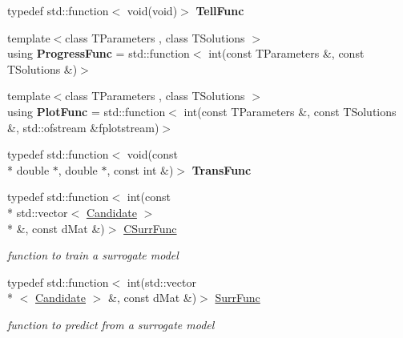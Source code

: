 \begin{DoxyCompactItemize}
\item 
\hypertarget{namespacelibcmaes_acee23101cbc8d94c127b10f3c04a595e}{typedef std\+::function$<$ void(void)$>$ {\bfseries Tell\+Func}}\label{namespacelibcmaes_acee23101cbc8d94c127b10f3c04a595e}

\item 
\hypertarget{namespacelibcmaes_a8d4db4c2a1758fd5964499aba7cf8a9f}{{\footnotesize template$<$class T\+Parameters , class T\+Solutions $>$ }\\using {\bfseries Progress\+Func} = std\+::function$<$ int(const T\+Parameters \&, const T\+Solutions \&)$>$}\label{namespacelibcmaes_a8d4db4c2a1758fd5964499aba7cf8a9f}

\item 
\hypertarget{namespacelibcmaes_aaf23de7982c40bf628eba76801677b78}{{\footnotesize template$<$class T\+Parameters , class T\+Solutions $>$ }\\using {\bfseries Plot\+Func} = std\+::function$<$ int(const T\+Parameters \&, const T\+Solutions \&, std\+::ofstream \&fplotstream)$>$}\label{namespacelibcmaes_aaf23de7982c40bf628eba76801677b78}

\item 
\hypertarget{namespacelibcmaes_a05b1e5e516cec9483ccdb964284ef82c}{typedef std\+::function$<$ void(const \\*
double $\ast$, double $\ast$, const int \&)$>$ {\bfseries Trans\+Func}}\label{namespacelibcmaes_a05b1e5e516cec9483ccdb964284ef82c}

\item 
typedef std\+::function$<$ int(const \\*
std\+::vector$<$ \hyperlink{classlibcmaes_1_1Candidate}{Candidate} $>$\\*
 \&, const d\+Mat \&)$>$ \hyperlink{namespacelibcmaes_ac7e88b4dfdaf94d6fa1e831ed5d9437e}{C\+Surr\+Func}
\begin{DoxyCompactList}\small\item\em function to train a surrogate model \end{DoxyCompactList}\item 
typedef std\+::function$<$ int(std\+::vector\\*
$<$ \hyperlink{classlibcmaes_1_1Candidate}{Candidate} $>$ \&, const d\+Mat \&)$>$ \hyperlink{namespacelibcmaes_a7115c4ca01f7e080f5c39c076242bf00}{Surr\+Func}
\begin{DoxyCompactList}\small\item\em function to predict from a surrogate model \end{DoxyCompactList}\end{DoxyCompactItemize}
